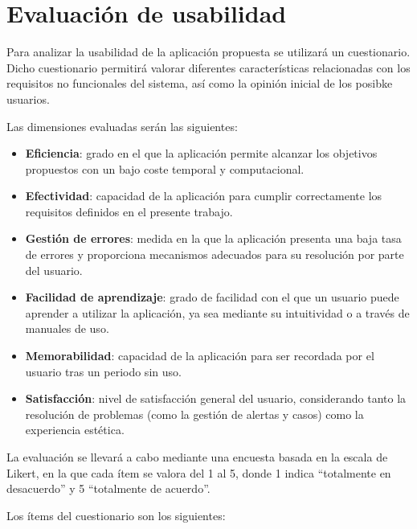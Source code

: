 \chapter{Evaluación de usabilidad} \label{Anexo:CuestionarioUsabilidad}

Para analizar la usabilidad de la aplicación propuesta se utilizará un cuestionario. Dicho cuestionario permitirá valorar diferentes características relacionadas con los requisitos no funcionales del sistema, así como la opinión inicial de los posibke usuarios.

Las dimensiones evaluadas serán las siguientes:

\begin{itemize}
    \item \textbf{Eficiencia}: grado en el que la aplicación permite alcanzar los objetivos propuestos con un bajo coste temporal y computacional.
    \item \textbf{Efectividad}: capacidad de la aplicación para cumplir correctamente los requisitos definidos en el presente trabajo.
    \item \textbf{Gestión de errores}: medida en la que la aplicación presenta una baja tasa de errores y proporciona mecanismos adecuados para su resolución por parte del usuario.
    \item \textbf{Facilidad de aprendizaje}: grado de facilidad con el que un usuario puede aprender a utilizar la aplicación, ya sea mediante su intuitividad o a través de manuales de uso.
    \item \textbf{Memorabilidad}: capacidad de la aplicación para ser recordada por el usuario tras un periodo sin uso.
    \item \textbf{Satisfacción}: nivel de satisfacción general del usuario, considerando tanto la resolución de problemas (como la gestión de alertas y casos) como la experiencia estética.
\end{itemize}

La evaluación se llevará a cabo mediante una encuesta basada en la escala de Likert, en la que cada ítem se valora del 1 al 5, donde 1 indica ``totalmente en desacuerdo'' y 5 ``totalmente de acuerdo''.

Los ítems del cuestionario son los siguientes:

